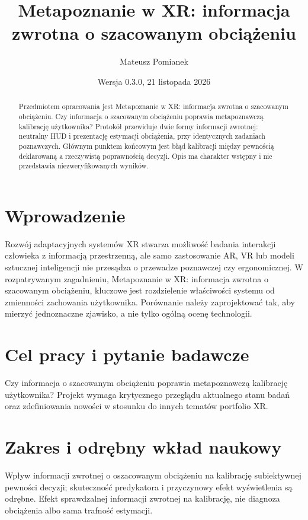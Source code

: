 \documentclass[11pt,a4paper]{article}
\title{Metapoznanie w XR: informacja zwrotna o szacowanym obciążeniu}
\author{Mateusz Pomianek}
\date{Wersja 0.3.0, 21 listopada 2026}
\begin{document}
\maketitle

\begin{abstract}

Przedmiotem opracowania jest Metapoznanie w XR: informacja zwrotna o szacowanym obciążeniu. Czy informacja o szacowanym obciążeniu poprawia metapoznawczą kalibrację użytkownika? Protokół przewiduje dwie formy informacji zwrotnej: neutralny HUD i prezentację estymacji obciążenia, przy identycznych zadaniach poznawczych. Głównym punktem końcowym jest błąd kalibracji między pewnością deklarowaną a rzeczywistą poprawnością decyzji. Opis ma charakter wstępny i nie przedstawia niezweryfikowanych wyników.

\end{abstract}

\section{Wprowadzenie}

Rozwój adaptacyjnych systemów XR stwarza możliwość badania interakcji człowieka z informacją przestrzenną, ale samo zastosowanie AR, VR lub modeli sztucznej inteligencji nie przesądza o przewadze poznawczej czy ergonomicznej. W rozpatrywanym zagadnieniu, Metapoznanie w XR: informacja zwrotna o szacowanym obciążeniu, kluczowe jest rozdzielenie właściwości systemu od zmienności zachowania użytkownika. Porównanie należy zaprojektować tak, aby mierzyć jednoznaczne zjawisko, a nie tylko ogólną ocenę technologii.

\section{Cel pracy i pytanie badawcze}

Czy informacja o szacowanym obciążeniu poprawia metapoznawczą kalibrację użytkownika? Projekt wymaga krytycznego przeglądu aktualnego stanu badań oraz zdefiniowania nowości w stosunku do innych tematów portfolio XR.

\section{Zakres i odrębny wkład naukowy}
Wpływ informacji zwrotnej o oszacowanym obciążeniu na kalibrację subiektywnej pewności decyzji; skuteczność predykatora i przyczynowy efekt wyświetlenia są odrębne. Efekt sprawdzalnej informacji zwrotnej na kalibrację, nie diagnoza obciążenia albo sama trafność estymacji.
\end{document}

